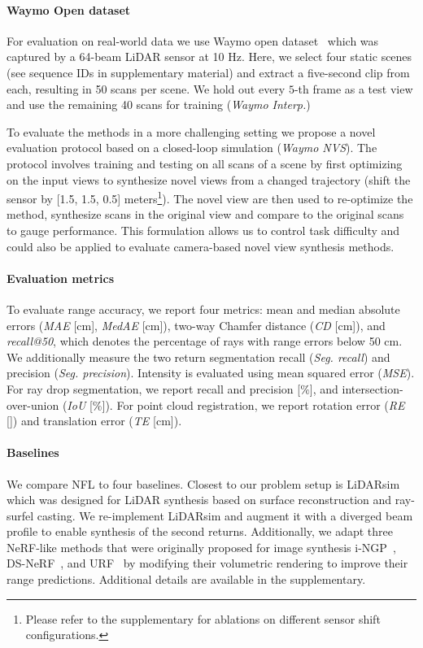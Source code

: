  \paragraph{Waymo Open dataset}
 For evaluation on real-world data we use Waymo open dataset~\cite{sun2020scalability} which was captured by a 64-beam LiDAR sensor at 10 Hz. Here, we select four static scenes (see sequence IDs in supplementary material) and extract a five-second clip from each, resulting in 50 scans per scene. We hold out every $5$-th frame as a test view and use the remaining 40 scans for training (\textit{Waymo Interp.})
 
To evaluate the methods in a more challenging setting we propose a novel evaluation protocol based on a closed-loop simulation (\emph{Waymo NVS}). The protocol involves training and testing on all scans of a scene by first optimizing on the input views to synthesize novel views from a changed trajectory (shift the sensor by [1.5, 1.5, 0.5] meters\footnote{Please refer to the supplementary for ablations on different sensor shift configurations.}). The novel view are then used to re-optimize the method, synthesize scans in the original view and compare to the original scans to gauge performance. This formulation allows us to control task difficulty and could also be applied to evaluate camera-based novel view synthesis methods.



\paragraph{Evaluation metrics}
To evaluate range accuracy, we report four metrics: mean and median absolute errors (\textit{MAE} [cm], \textit{MedAE} [cm]),  two-way Chamfer distance (\textit{CD} [cm]), and \textit{recall@50}, which denotes the percentage of rays with range errors below 50 cm. 
We additionally measure the two return segmentation recall (\textit{Seg. recall}) and precision (\textit{Seg. precision}).
Intensity is evaluated using mean squared error (\textit{MSE}).
For ray drop segmentation, we report recall and precision [$\%$], and intersection-over-union (\textit{IoU} [$\%$]). For point cloud registration, we report rotation error (\textit{RE} [\degree]) and translation error (\textit{TE} [cm]).


\paragraph{Baselines}
We compare NFL to four baselines. Closest to our problem setup is LiDARsim~\cite{manivasagam2020lidarsim} which was designed for LiDAR synthesis based on surface reconstruction and ray-surfel casting. We re-implement LiDARsim and augment it with a diverged beam profile to enable synthesis of the second returns. Additionally, we adapt three NeRF-like methods that were originally proposed for image synthesis i-NGP~\cite{mueller2022instant}, DS-NeRF~\cite{deng2021depth}, and URF~\cite{rematas2021urban} by modifying their volumetric rendering to improve their range predictions. 
Additional details are available in the supplementary.


